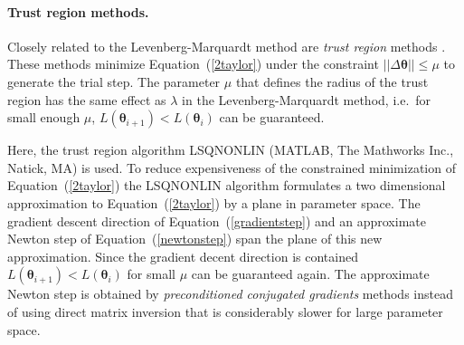 \documentclass[12pt,a4paper]{scrartcl}
\begin{document}
\paragraph{Trust region methods.}
Closely related to the Levenberg-Marquardt method are \emph{trust region} methods \citep{Coleman:1996fk}. These methods minimize Equation~(\ref{2taylor}) under the constraint $\left|\left| \Delta \boldsymbol{\theta} \right|\right| \leq \mu $ to generate the trial step. The parameter $\mu$ that defines the radius of the trust region has the same effect as $\lambda$ in the Levenberg-Marquardt method, i.e.~for small enough $\mu$, $L(\boldsymbol{\theta}_{i+1}) < L(\boldsymbol{\theta}_{i})$ can be guaranteed.

Here, the trust region algorithm LSQNONLIN (MATLAB, The Mathworks Inc., Natick, MA) is used. To reduce expensiveness of the constrained minimization of Equation~(\ref{2taylor}) the LSQNONLIN algorithm formulates a two dimensional approximation to Equation~(\ref{2taylor}) by a plane in parameter space. The gradient descent direction of Equation~(\ref{gradientstep}) and an approximate Newton step of Equation~(\ref{newtonstep}) span the plane of this new approximation. Since the gradient decent direction is contained $L(\boldsymbol{\theta}_{i+1}) < L(\boldsymbol{\theta}_{i})$ for small $\mu$ can be guaranteed again. The approximate Newton step is obtained by \emph{preconditioned conjugated gradients} methods \citep{Barrett:1994uq} instead of using direct matrix inversion that is considerably slower for large parameter space.
\end{document}
